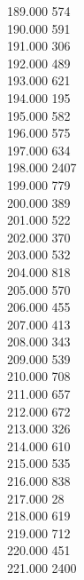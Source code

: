 { 189.000	574 \\
 190.000	591 \\
 191.000	306 \\
 192.000	489 \\
 193.000	621 \\
 194.000	195 \\
 195.000	582 \\
 196.000	575 \\
 197.000	634 \\
 198.000	2407 \\
 199.000	779 \\
 200.000	389 \\
 201.000	522 \\
 202.000	370 \\
 203.000	532 \\
 204.000	818 \\
 205.000	570 \\
 206.000	455 \\
 207.000	413 \\
 208.000	343 \\
 209.000	539 \\
 210.000	708 \\
 211.000	657 \\
 212.000	672 \\
 213.000	326 \\
 214.000	610 \\
 215.000	535 \\
 216.000	838 \\
 217.000	28 \\
 218.000	619 \\
 219.000	712 \\
 220.000	451 \\
 221.000	2400 \\
}
